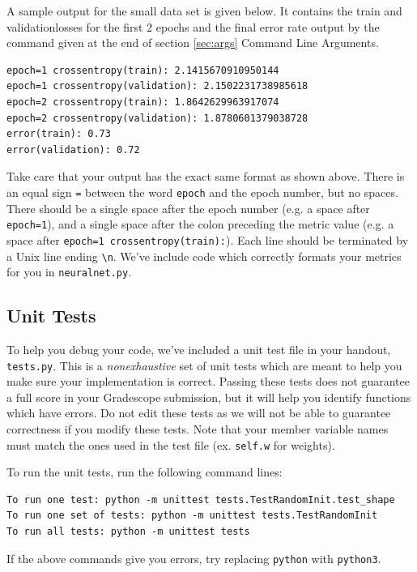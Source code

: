\documentclass[11pt,addpoints,answers]{exam}
\begin{document}
A sample output for the small data set is given below. It contains the train and validation\thinspace losses for the first 2 epochs and the final error rate output by the command given at the end of section
\ref{sec:args} Command Line Arguments.

\begin{lstlisting}
epoch=1 crossentropy(train): 2.1415670910950144
epoch=1 crossentropy(validation): 2.1502231738985618
epoch=2 crossentropy(train): 1.8642629963917074
epoch=2 crossentropy(validation): 1.8780601379038728
error(train): 0.73
error(validation): 0.72
\end{lstlisting}

Take care that your output has the exact same format as shown above. There is an equal sign \lstinline{=} between the word \lstinline{epoch} and the epoch number, but no spaces. There should be a single space after the epoch number (e.g. a space after \lstinline{epoch=1}), and a single space after the colon preceding the metric value (e.g. a space after \lstinline{epoch=1 crossentropy(train):}). Each line should be terminated by a Unix line ending \lstinline{\n}. We've include code which correctly formats your metrics for you in \texttt{neuralnet.py}.

\subsection{Unit Tests} \label{unittests}
To help you debug your code, we've included a unit test file in your handout, \texttt{tests.py}. This is a \emph{nonexhaustive} set of unit tests which are meant to help you make sure your implementation is correct. Passing these tests does not guarantee a full score in your Gradescope submission, but it will help you identify functions which have errors. Do not edit these tests as we will not be able to guarantee correctness if you modify these tests. Note that your member variable names must match the ones used in the test file (ex. \texttt{self.w} for weights).

To run the unit tests, run the following command lines:
\begin{lstlisting}[language=Shell]
To run one test: python -m unittest tests.TestRandomInit.test_shape
To run one set of tests: python -m unittest tests.TestRandomInit
To run all tests: python -m unittest tests
\end{lstlisting}

If the above commands give you errors, try replacing \texttt{python} with \texttt{python3}.
\end{document}
